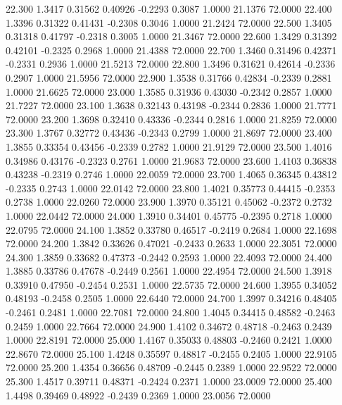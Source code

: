   22.300   1.3417   0.31562   0.40926  -0.2293   0.3087   1.0000  21.1376  72.0000
  22.400   1.3396   0.31322   0.41431  -0.2308   0.3046   1.0000  21.2424  72.0000
  22.500   1.3405   0.31318   0.41797  -0.2318   0.3005   1.0000  21.3467  72.0000
  22.600   1.3429   0.31392   0.42101  -0.2325   0.2968   1.0000  21.4388  72.0000
  22.700   1.3460   0.31496   0.42371  -0.2331   0.2936   1.0000  21.5213  72.0000
  22.800   1.3496   0.31621   0.42614  -0.2336   0.2907   1.0000  21.5956  72.0000
  22.900   1.3538   0.31766   0.42834  -0.2339   0.2881   1.0000  21.6625  72.0000
  23.000   1.3585   0.31936   0.43030  -0.2342   0.2857   1.0000  21.7227  72.0000
  23.100   1.3638   0.32143   0.43198  -0.2344   0.2836   1.0000  21.7771  72.0000
  23.200   1.3698   0.32410   0.43336  -0.2344   0.2816   1.0000  21.8259  72.0000
  23.300   1.3767   0.32772   0.43436  -0.2343   0.2799   1.0000  21.8697  72.0000
  23.400   1.3855   0.33354   0.43456  -0.2339   0.2782   1.0000  21.9129  72.0000
  23.500   1.4016   0.34986   0.43176  -0.2323   0.2761   1.0000  21.9683  72.0000
  23.600   1.4103   0.36838   0.43238  -0.2319   0.2746   1.0000  22.0059  72.0000
  23.700   1.4065   0.36345   0.43812  -0.2335   0.2743   1.0000  22.0142  72.0000
  23.800   1.4021   0.35773   0.44415  -0.2353   0.2738   1.0000  22.0260  72.0000
  23.900   1.3970   0.35121   0.45062  -0.2372   0.2732   1.0000  22.0442  72.0000
  24.000   1.3910   0.34401   0.45775  -0.2395   0.2718   1.0000  22.0795  72.0000
  24.100   1.3852   0.33780   0.46517  -0.2419   0.2684   1.0000  22.1698  72.0000
  24.200   1.3842   0.33626   0.47021  -0.2433   0.2633   1.0000  22.3051  72.0000
  24.300   1.3859   0.33682   0.47373  -0.2442   0.2593   1.0000  22.4093  72.0000
  24.400   1.3885   0.33786   0.47678  -0.2449   0.2561   1.0000  22.4954  72.0000
  24.500   1.3918   0.33910   0.47950  -0.2454   0.2531   1.0000  22.5735  72.0000
  24.600   1.3955   0.34052   0.48193  -0.2458   0.2505   1.0000  22.6440  72.0000
  24.700   1.3997   0.34216   0.48405  -0.2461   0.2481   1.0000  22.7081  72.0000
  24.800   1.4045   0.34415   0.48582  -0.2463   0.2459   1.0000  22.7664  72.0000
  24.900   1.4102   0.34672   0.48718  -0.2463   0.2439   1.0000  22.8191  72.0000
  25.000   1.4167   0.35033   0.48803  -0.2460   0.2421   1.0000  22.8670  72.0000
  25.100   1.4248   0.35597   0.48817  -0.2455   0.2405   1.0000  22.9105  72.0000
  25.200   1.4354   0.36656   0.48709  -0.2445   0.2389   1.0000  22.9522  72.0000
  25.300   1.4517   0.39711   0.48371  -0.2424   0.2371   1.0000  23.0009  72.0000
  25.400   1.4498   0.39469   0.48922  -0.2439   0.2369   1.0000  23.0056  72.0000
